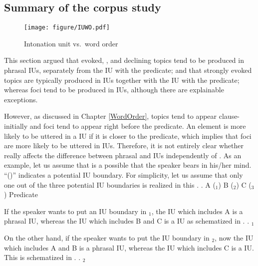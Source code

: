 \subsection{Summary of the corpus study}

\begin{figure}
\centering
	\begin{center}
	\texttt{[image: figure/IUWO.pdf]}
	\caption{Intonation unit vs.~word order}
	\label{IUWOF}
	\end{center}
\end{figure}



This section argued that
evoked, , and declining topics tend to be produced in phrasal IUs,
separately from the IU with the predicate; and that
strongly evoked topics are typically produced in  IUs
together with the IU with the predicate;
whereas foci tend to be produced in  IUs,
although there are explainable exceptions.

However, as discussed in Chapter \ref{WordOrder},
topics tend to appear clause-initially and foci tend to appear right before the predicate.
An element is more likely to be uttered in a  IU if it is closer to the predicate,
which implies that
foci are more likely to be uttered in  IUs.
Therefore, it is not entirely clear whether  really
affects the difference between phrasal and  IUs independently of .
As an example, let us assume that \Next is a possible  that the speaker bears in his/her mind.
``(\tp{\dvline})'' indicates a potential IU boundary.
For simplicity,
let us assume that
only one out of the three potential IU boundaries is realized in this .
%
\ex. A (\tp{\dvline}$_1$) B (\tp{\dvline}$_2$) C (\tp{\dvline}$_3$) Predicate

If the speaker wants to put an IU boundary in \tp{\dvline}$_1$,
the IU which includes A is a phrasal IU,
whereas the IU which includes B and C is a  IU
as schematized in \Next.
%
\ex.  \tp{\dvline}$_1$ 

On the other hand, if the speaker wants to put the IU boundary in \tp{\dvline}$_2$,
now the IU which includes A and B is a phrasal IU,
whereas the IU which includes C is a  IU.
This is schematized in \Next.
%
\ex.  \tp{\dvline}$_2$ 

